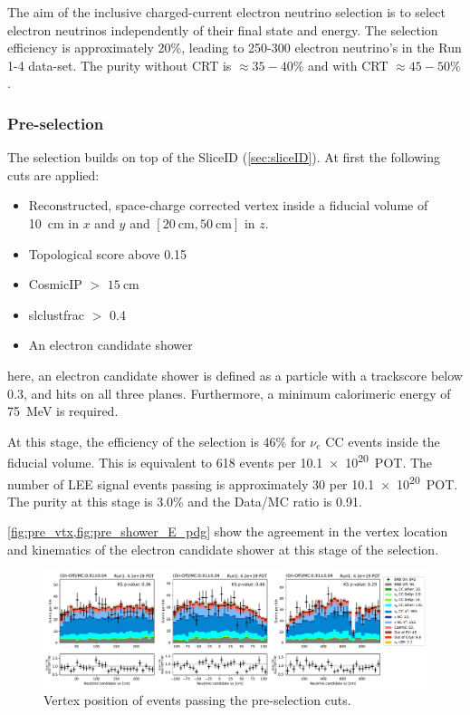 \label{sec:nueselection:inclusive}

The aim of the inclusive charged-current electron neutrino selection is to select electron neutrinos independently of their final state and energy. The selection efficiency is approximately 20\%, leading to 250-300 electron neutrino's in the Run 1-4 data-set. The purity without CRT is $\approx 35-40\%$ and with CRT $\approx 45-50\%$.

\subsubsection{Pre-selection}
The selection builds on top of the SliceID (\cref{sec:sliceID}). At first the following cuts are applied:
\begin{itemize}
    \item Reconstructed, space-charge corrected vertex inside a fiducial volume of \SI{10}{\cm} in $x$ and $y$ and $[ \SI{20}{\cm}, \SI{50}{\cm}]$ in $z$.
    \item Topological score above 0.15
    \item CosmicIP $>$ $\SI{15}{\cm}$
    \item slclustfrac $>$ 0.4
    \item An electron candidate shower
\end{itemize}
here, an electron candidate shower is defined as a particle with a trackscore below 0.3, and hits on all three planes. Furthermore, a minimum calorimeric energy of \SI{75}{\MeV} is required. 

At this stage, the efficiency of the selection is 46\% for $\nu_e$ CC events inside the fiducial volume. This is equivalent to 618 events per \SI{10.1e20}{POT}. The number of LEE signal events passing is approximately 30 per \SI{10.1e20}{POT}. The purity at this stage is 3.0\% and the Data/MC ratio is 0.91.

\cref{fig:pre_vtx,fig:pre_shower_E_pdg} show the agreement in the vertex location and kinematics of the electron candidate shower at this stage of the selection. 

\begin{figure}[]
    \centering
    \includegraphics[width=\textwidth]{NueCCsel/Images/run1/pre_vtx.pdf}
    \caption{Vertex position of events passing the pre-selection cuts.}
    \label{fig:pre_vtx}
\end{figure}

